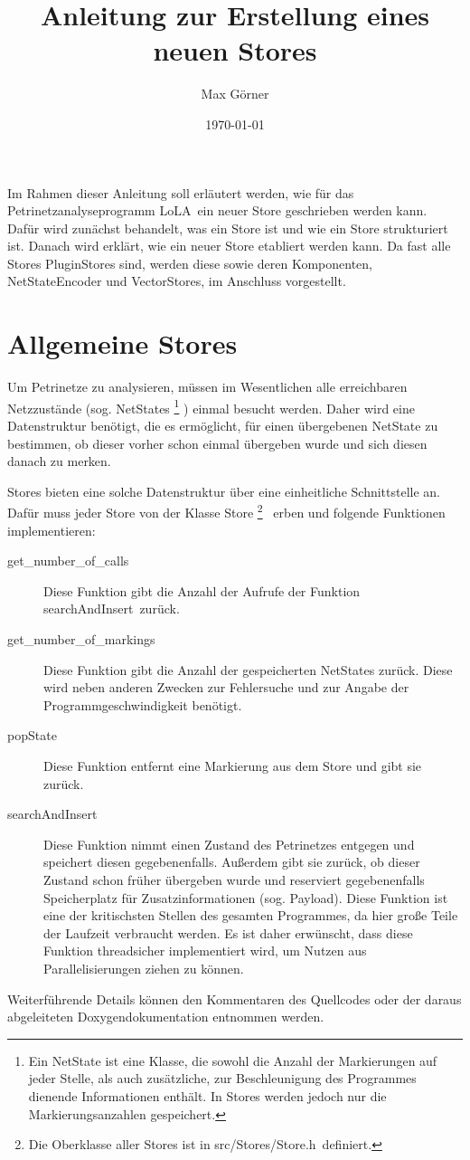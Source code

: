 \documentclass[12pt,a4paper,titlepage]{scrartcl}
\title{Anleitung zur Erstellung eines neuen Stores}
\author{Max Görner}
\date{\today}
\renewcommand \( {\left (}
\renewcommand \) {\right )}
\renewcommand \[ {\left [}
\renewcommand \] {\right ]}
\newcommand \Flqq {\flqq\ }
\newcommand{\lola}{\frqq LoLA\Flqq}
\begin{document}
\maketitle
Im Rahmen dieser Anleitung soll erläutert werden, wie für das Petrinetzanalyseprogramm \lola ein neuer Store geschrieben werden kann. Dafür wird zunächst behandelt, was ein Store ist und wie ein Store strukturiert ist. Danach wird erklärt, wie ein neuer Store etabliert werden kann. Da fast alle Stores PluginStores sind, werden diese sowie deren Komponenten, NetStateEncoder und VectorStores, im Anschluss vorgestellt.

\section{Allgemeine Stores}
Um Petrinetze zu analysieren, müssen im Wesentlichen alle erreichbaren Netzzustände (sog. NetStates
\footnote{Ein NetState ist eine Klasse, die sowohl die Anzahl der Markierungen auf jeder Stelle, als auch zusätzliche, zur Beschleunigung des Programmes dienende Informationen enthält. In Stores werden jedoch nur die Markierungsanzahlen gespeichert.}
) einmal besucht werden. Daher wird eine Datenstruktur benötigt, die es ermöglicht, für einen übergebenen NetState zu bestimmen, ob dieser vorher schon einmal übergeben wurde und sich diesen danach zu merken.

Stores bieten eine solche Datenstruktur über eine einheitliche Schnittstelle an. Dafür muss jeder Store von der Klasse \frqq Store
\footnote{Die Oberklasse aller Stores ist in \frqq src/Stores/Store.h\Flqq definiert.}
\Flqq erben und folgende Funktionen implementieren:
\begin{description}
\item[get\_number\_of\_calls] Diese Funktion gibt die Anzahl der Aufrufe der Funktion \frqq searchAndInsert\Flqq zurück.
\item[get\_number\_of\_markings] Diese Funktion gibt die Anzahl der gespeicherten NetStates zurück. Diese wird neben anderen Zwecken zur Fehlersuche und zur Angabe der Programmgeschwindigkeit benötigt.
\item[popState] Diese Funktion entfernt eine Markierung aus dem Store und gibt sie zurück.
\item[searchAndInsert] Diese Funktion nimmt einen Zustand des Petrinetzes entgegen und speichert diesen gegebenenfalls. Außerdem gibt sie zurück, ob dieser Zustand schon früher übergeben wurde und reserviert gegebenenfalls Speicherplatz für Zusatzinformationen (sog. Payload). Diese Funktion ist eine der kritischsten Stellen des gesamten Programmes, da hier große Teile der Laufzeit verbraucht werden. Es ist daher erwünscht, dass diese Funktion threadsicher implementiert wird, um Nutzen aus Parallelisierungen ziehen zu können.
\end{description}
Weiterführende Details können den Kommentaren des Quellcodes oder der daraus abgeleiteten Doxygendokumentation entnommen werden.
\end{document}
